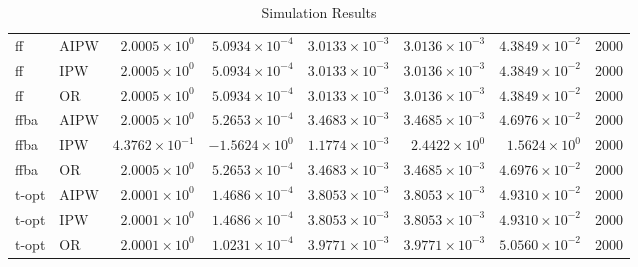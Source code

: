 \begin{table}[ht]
\begin{tabular}{llrrrrrr}
   \midrule
ff & AIPW & $2.0005 \times 10^{0}$ & $5.0934 \times 10^{-4}$ & $3.0133 \times 10^{-3}$ & $3.0136 \times 10^{-3}$ & $4.3849 \times 10^{-2}$ & 2000 \\ 
  ff & IPW & $2.0005 \times 10^{0}$ & $5.0934 \times 10^{-4}$ & $3.0133 \times 10^{-3}$ & $3.0136 \times 10^{-3}$ & $4.3849 \times 10^{-2}$ & 2000 \\ 
  ff & OR & $2.0005 \times 10^{0}$ & $5.0934 \times 10^{-4}$ & $3.0133 \times 10^{-3}$ & $3.0136 \times 10^{-3}$ & $4.3849 \times 10^{-2}$ & 2000 \\ 
   \midrule
ffba & AIPW & $2.0005 \times 10^{0}$ & $5.2653 \times 10^{-4}$ & $3.4683 \times 10^{-3}$ & $3.4685 \times 10^{-3}$ & $4.6976 \times 10^{-2}$ & 2000 \\ 
  ffba & IPW & $4.3762 \times 10^{-1}$ & $-1.5624 \times 10^{0}$ & $1.1774 \times 10^{-3}$ & $2.4422 \times 10^{0}$ & $1.5624 \times 10^{0}$ & 2000 \\ 
  ffba & OR & $2.0005 \times 10^{0}$ & $5.2653 \times 10^{-4}$ & $3.4683 \times 10^{-3}$ & $3.4685 \times 10^{-3}$ & $4.6976 \times 10^{-2}$ & 2000 \\ 
   \midrule
t-opt & AIPW & $2.0001 \times 10^{0}$ & $1.4686 \times 10^{-4}$ & $3.8053 \times 10^{-3}$ & $3.8053 \times 10^{-3}$ & $4.9310 \times 10^{-2}$ & 2000 \\ 
  t-opt & IPW & $2.0001 \times 10^{0}$ & $1.4686 \times 10^{-4}$ & $3.8053 \times 10^{-3}$ & $3.8053 \times 10^{-3}$ & $4.9310 \times 10^{-2}$ & 2000 \\ 
  t-opt & OR & $2.0001 \times 10^{0}$ & $1.0231 \times 10^{-4}$ & $3.9771 \times 10^{-3}$ & $3.9771 \times 10^{-3}$ & $5.0560 \times 10^{-2}$ & 2000 \\ 
   \bottomrule
\end{tabular}
\caption{Simulation Results} 
\label{tab:results}
\end{table}
